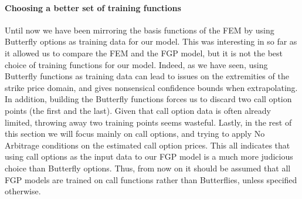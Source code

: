 \documentclass[a4paper,12pt]{article}
\begin{document}
\paragraph{Choosing a better set of training functions}
Until now we have been mirroring the basis functions of the FEM by using Butterfly options as training data for our model. This was interesting in so far as it allowed us to compare the FEM and the FGP model, but it is not the best choice of training functions for our model. Indeed, as we have seen, using Butterfly functions as training data can lead to issues on the extremities of the strike price domain, and gives nonsensical confidence bounds when extrapolating. In addition, building the Butterfly functions forces us to discard two call option points (the first and the last). Given that call option data is often already limited, throwing away two training points seems wasteful. Lastly, in the rest of this section we will focus mainly on call options, and trying to apply No Arbitrage conditions on the estimated call option prices. This all indicates that using call options as the input data to our FGP model is a much more judicious choice than Butterfly options. Thus, from now on it should be assumed that all FGP models are trained on call functions rather than Butterflies, unless specified otherwise.
\end{document}
